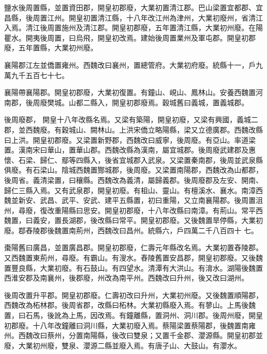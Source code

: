 \begin{pinyinscope}
 鹽水後周置縣，並置資田郡，開皇初郡廢，大業初置清江郡。巴山梁置宜都郡、宜昌縣，後周置江州。開皇初置清江縣，十八年改江州為津州，大業初廢州，省清江入焉。清江後周置施州及清江郡。開皇初郡廢，五年置清江縣，大業初州廢。在陽瞿水。開夷後周置，曰烏飛，開皇初改焉。建始後周置業州及軍屯郡。開皇初郡廢，五年置縣，大業初州廢。



 襄陽郡江左並僑置雍州。西魏改曰襄州，置總管府。大業初府廢。統縣十一，戶九萬九千五百七十七。



 襄陽帶襄陽郡。開皇初郡廢，大業初復置。有鐘山、峴山、鳳林山。安養西魏置河南郡，後周廢樊城。山都二縣入，開皇初郡廢焉。穀城舊曰義城，置義城郡。



 後周廢郡，
 開皇十八年改縣名焉。又梁有築陽，開皇初廢，又梁有興國，義城二郡，並西魏廢。有穀城山、闕林山。上洪宋僑立略陽縣，梁又立德廣郡。西魏改縣曰上洪。開皇初郡廢。又梁置新野郡，西魏改曰威寧，後周廢。有亞山。率道梁置。漢南宋曰華山，置華山郡。西魏改縣為漢南，屬宜城郡。後周廢武建郡及惠懷、石梁、歸仁、鄢等四縣入，後省宜城郡入武泉。又梁置秦南郡，後周並武泉縣俱廢。有石梁山。陰城西魏置酂城郡，後周廢。又梁置南陽郡，西魏改為山都郡，後周省。義清梁置，曰穰縣。西魏改為義清，屬歸義郡。後周廢郡及左安、開南、歸仁三縣入焉。又有武泉郡，開皇初廢。有柤山、靈山。有檀溪水、襄水。南漳西魏並新安、武昌、武平、安武、建平五縣置，初曰重陽，又立南襄陽郡。後周置沮州，尋廢，復改重陽縣曰思安。開皇初郡廢，十八年改縣曰南漳。有荊山。常平西魏置，曰義安，置長湖郡，後改縣曰常平。開皇初郡廢。又後魏置旱停縣，大業初廢。鄀舂陵郡後魏置南荊州，西魏改曰昌州。統縣六，戶四萬二千八百四十
 七。



 棗陽舊曰廣昌，並置廣昌郡。開皇初郡廢，仁壽元年縣改名焉。大業初置舂陵郡。又西魏置東荊州，尋廢。有霸山。有溲水。舂陵舊置安昌郡，開皇初郡廢。又後魏置豐良縣，大業初廢。有石鼓山。有四望水。清潭有大洪山。有淯水。湖陽後魏置西淮安郡及南襄州，後郡廢，州改為南平州。西魏改曰升州，後又改曰湖州。



 後周改置升平郡。開皇初郡廢。仁壽初改曰升州，大業初州廢。又後魏置順陽郡，西魏改為柘林郡。後周省郡，改縣曰柘林。大業初縣廢入焉。有蓼山。上馬後魏置，曰石馬，後訛為上馬，因改焉。有鐘離縣，置洞州、洞川郡。後周州廢，開皇初郡廢。十八年改鐘離曰洞川縣，大業初廢入焉。蔡陽梁置蔡陽郡，後魏置南雍州。西魏改曰蔡州，分置南陽縣，後改曰雙泉；又置千金郡、瀴源縣。開皇初郡並廢，大業初州廢，雙泉、瀴源二縣並廢入焉。有唐子山、大鼓山。有瀴水。




\end{pinyinscope}
